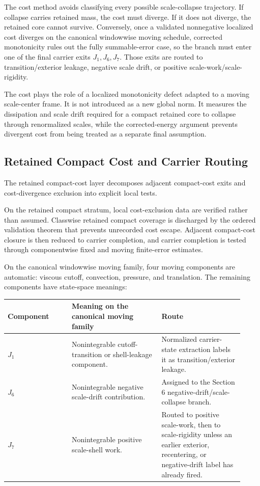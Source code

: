 \documentclass[11pt]{amsart}
\begin{document}
The cost method avoids classifying every possible scale-collapse trajectory.  If collapse carries retained mass, the cost must diverge.  If it does not diverge, the retained core cannot survive.  Conversely, once a validated nonnegative localized cost diverges on the canonical windowwise moving schedule, corrected monotonicity rules out the fully summable-error case, so the branch must enter one of the final carrier exits \(J_1,J_6,J_7\).  Those exits are routed to transition/exterior leakage, negative scale drift, or positive scale-work/scale-rigidity.

The cost plays the role of a localized monotonicity defect adapted to a moving scale-center frame.  It is not introduced as a new global norm.  It measures the dissipation and scale drift required for a compact retained core to collapse through renormalized scales, while the corrected-energy argument prevents divergent cost from being treated as a separate final assumption.

\subsection{Retained Compact Cost and Carrier Routing}

The retained compact-cost layer decomposes adjacent compact-cost exits and cost-divergence exclusion into explicit local tests.

On the retained compact stratum, local cost-exclusion data are verified rather than assumed.  Classwise retained compact coverage is discharged by the ordered validation theorem that prevents unrecorded cost escape.  Adjacent compact-cost closure is then reduced to carrier completion, and carrier completion is tested through componentwise fixed and moving finite-error estimates.

On the canonical windowwise moving family, four moving components are automatic: viscous cutoff, convection, pressure, and translation.  The remaining components have state-space meanings:

\begin{longtable}{@{}>{\raggedright\arraybackslash}p{0.25\linewidth}>{\raggedright\arraybackslash}p{0.35\linewidth}>{\raggedright\arraybackslash}p{0.32\linewidth}@{}}
\toprule
\textbf{Component} & \textbf{Meaning on the canonical moving family} & \textbf{Route} \\
\midrule
\endhead
\(J_1\) & Nonintegrable cutoff-transition or shell-leakage component. & Normalized carrier-state extraction labels it as transition/exterior leakage. \\
\(J_6\) & Nonintegrable negative scale-drift contribution. & Assigned to the Section 6 negative-drift/scale-collapse branch. \\
\(J_7\) & Nonintegrable positive scale-shell work. & Routed to positive scale-work, then to scale-rigidity unless an earlier exterior, recentering, or negative-drift label has already fired. \\
\bottomrule
\end{longtable}
\end{document}
